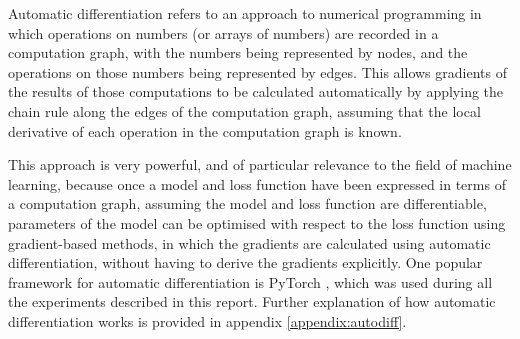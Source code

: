 Automatic differentiation refers to an approach to numerical programming in which operations on numbers (or arrays of numbers) are recorded in a computation graph, with the numbers being represented by nodes, and the operations on those numbers being represented by edges. This allows gradients of the results of those computations to be calculated automatically by applying the chain rule along the edges of the computation graph, assuming that the local derivative of each operation in the computation graph is known.

This approach is very powerful, and of particular relevance to the field of machine learning, because once a model and loss function have been expressed in terms of a computation graph, assuming the model and loss function are differentiable, parameters of the model can be optimised with respect to the loss function using gradient-based methods, in which the gradients are calculated using automatic differentiation, without having to derive the gradients explicitly. One popular framework for automatic differentiation is PyTorch \cite{paszke2019pytorch}, which was used during all the experiments described in this report. Further explanation of how automatic differentiation works is provided in appendix \ref{appendix:autodiff}.
